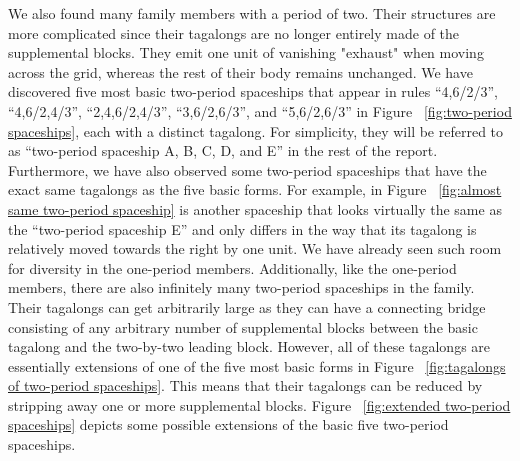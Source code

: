 \documentclass[12pt]{article}
\numberwithin{figure}{section} %
\begin{document}
We also found many family members with a period of two. Their structures are more complicated since their tagalongs are no longer entirely made of the supplemental blocks. They emit one unit of vanishing "exhaust" when moving across the grid, whereas the rest of their body remains unchanged. We have discovered five most basic two-period spaceships that appear in rules “4,6/2/3”, “4,6/2,4/3”, “2,4,6/2,4/3”, “3,6/2,6/3”, and “5,6/2,6/3” in Figure ~\ref{fig:two-period spaceships}, each with a distinct tagalong. For simplicity, they will be referred to as “two-period spaceship A, B, C, D, and E” in the rest of the report. Furthermore, we have also observed some two-period spaceships that have the exact same tagalongs as the five basic forms. For example, in Figure ~\ref{fig:almost same two-period spaceship} is another spaceship that looks virtually the same as the “two-period spaceship E” and only differs in the way that its tagalong is relatively moved towards the right by one unit. We have already seen such room for diversity in the one-period members. Additionally, like the one-period members, there are also infinitely many two-period spaceships in the family. Their tagalongs can get arbitrarily large as they can have a connecting bridge consisting of any arbitrary number of supplemental blocks between the basic tagalong and the two-by-two leading block. However, all of these tagalongs are essentially extensions of one of the five most basic forms in Figure ~\ref{fig:tagalongs of two-period spaceships}. This means that their tagalongs can be reduced by stripping away one or more supplemental blocks. Figure ~\ref{fig:extended two-period spaceships} depicts some possible extensions of the basic five two-period spaceships. 
\end{document}
